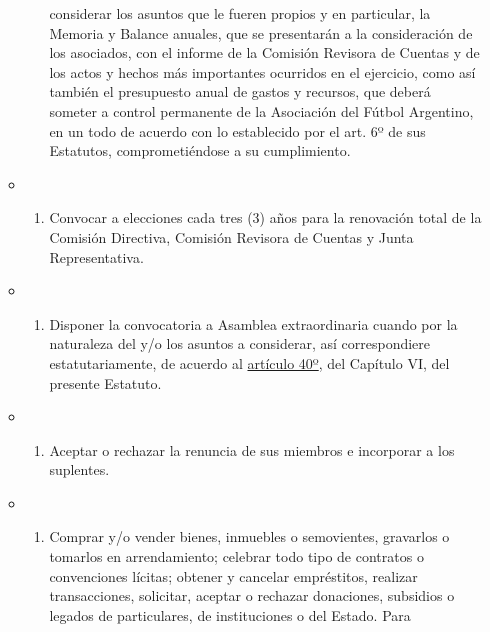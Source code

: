 \documentclass[]{book}
\providecommand{\tightlist}{%
  \setlength{\itemsep}{0pt}\setlength{\parskip}{0pt}}
\begin{document}
\begin{itemize}
\begin{itemize}
\begin{enumerate}
      considerar los asuntos que le fueren propios y en particular, la
      Memoria y Balance anuales, que se presentarán a la consideración
      de los asociados, con el informe de la Comisión Revisora de
      Cuentas y de los actos y hechos más importantes ocurridos en el
      ejercicio, como así también el presupuesto anual de gastos y
      recursos, que deberá someter a control permanente de la Asociación
      del Fútbol Argentino, en un todo de acuerdo con lo establecido por
      el art. 6º de sus Estatutos, comprometiéndose a su cumplimiento.
    \end{enumerate}
  \item
    \begin{enumerate}
    \def\labelenumi{\alph{enumi})}
    \setcounter{enumi}{4}
    \tightlist
    \item
      Convocar a elecciones cada tres (3) años para la renovación total
      de la Comisión Directiva, Comisión Revisora de Cuentas y Junta
      Representativa.
    \end{enumerate}
  \item
    \begin{enumerate}
    \def\labelenumi{\alph{enumi})}
    \setcounter{enumi}{5}
    \tightlist
    \item
      Disponer la convocatoria a Asamblea extraordinaria cuando por la
      naturaleza del y/o los asuntos a considerar, así correspondiere
      estatutariamente, de acuerdo al \protect\hyperlink{art40}{artículo
      40º}, del Capítulo VI, del presente Estatuto.
    \end{enumerate}
  \item
    \begin{enumerate}
    \def\labelenumi{\alph{enumi})}
    \setcounter{enumi}{6}
    \tightlist
    \item
      Aceptar o rechazar la renuncia de sus miembros e incorporar a los
      suplentes.
    \end{enumerate}
  \item
    \begin{enumerate}
    \def\labelenumi{\alph{enumi})}
    \setcounter{enumi}{7}
    \tightlist
    \item
      Comprar y/o vender bienes, inmuebles o semovientes, gravarlos o
      tomarlos en arrendamiento; celebrar todo tipo de contratos o
      convenciones lícitas; obtener y cancelar empréstitos, realizar
      transacciones, solicitar, aceptar o rechazar donaciones, subsidios
      o legados de particulares, de instituciones o del Estado. Para

\end{enumerate}
\end{itemize}
\end{itemize}
\end{document}
